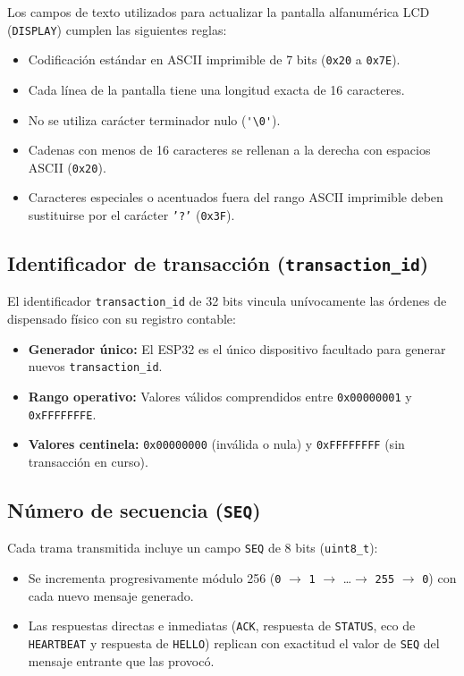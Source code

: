 \documentclass[a4paper,11pt]{article}
\begin{document}
Los campos de texto utilizados para actualizar la pantalla alfanumérica LCD (\texttt{DISPLAY})
cumplen las siguientes reglas:
\begin{itemize}[leftmargin=1.6em,itemsep=1pt,parsep=0pt,topsep=2pt]
    \item Codificación estándar en ASCII imprimible de 7 bits (\texttt{0x20} a \texttt{0x7E}).
    \item Cada línea de la pantalla tiene una longitud exacta de 16 caracteres.
    \item No se utiliza carácter terminador nulo (\lstinline|'\0'|).
    \item Cadenas con menos de 16 caracteres se rellenan a la derecha con espacios ASCII (\texttt{0x20}).
    \item Caracteres especiales o acentuados fuera del rango ASCII imprimible deben sustituirse por el carácter \texttt{'?'} (\texttt{0x3F}).
\end{itemize}

\subsection{Identificador de transacción (\texttt{transaction\_id})}

El identificador \texttt{transaction\_id} de 32 bits vincula unívocamente las órdenes
de dispensado físico con su registro contable:
\begin{itemize}[leftmargin=1.6em,itemsep=1pt,parsep=0pt,topsep=2pt]
    \item \textbf{Generador único:} El ESP32 es el único dispositivo facultado para generar nuevos \texttt{transaction\_id}.
    \item \textbf{Rango operativo:} Valores válidos comprendidos entre \texttt{0x00000001} y \texttt{0xFFFFFFFE}.
    \item \textbf{Valores centinela:} \texttt{0x00000000} (inválida o nula) y \texttt{0xFFFFFFFF} (sin transacción en curso).
\end{itemize}

\subsection{Número de secuencia (\texttt{SEQ})}

Cada trama transmitida incluye un campo \texttt{SEQ} de 8 bits (\texttt{uint8\_t}):
\begin{itemize}[leftmargin=1.6em,itemsep=1pt,parsep=0pt,topsep=2pt]
    \item Se incrementa progresivamente módulo 256 (\texttt{0} $\rightarrow$ \texttt{1} $\rightarrow$ \dots $\rightarrow$ \texttt{255} $\rightarrow$ \texttt{0}) con cada nuevo mensaje generado.
    \item Las respuestas directas e inmediatas (\texttt{ACK}, respuesta de \texttt{STATUS}, eco de \texttt{HEARTBEAT} y respuesta de \texttt{HELLO}) replican con exactitud el valor de \texttt{SEQ} del mensaje entrante que las provocó.
\end{itemize}
\end{document}
